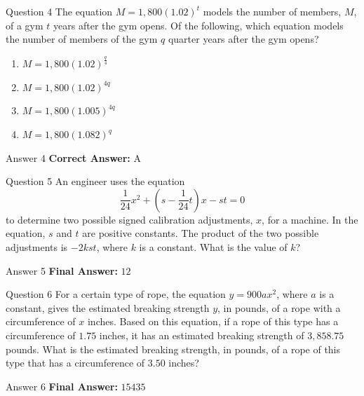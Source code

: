 \documentclass{beamer}
\begin{document}
\begin{frame}{Question 4}
\small
The equation \(M = 1{,}800(1.02)^t\) models the number of members, \(M\), of a gym \(t\) years after the gym opens.
Of the following, which equation models the number of members of the gym \(q\) quarter years after the gym opens?
\vspace{0.35cm}
\begin{enumerate}
    \item[A.] \(M = 1{,}800(1.02)^{\frac{q}{4}}\)
    \item[B.] \(M = 1{,}800(1.02)^{4q}\)
    \item[C.] \(M = 1{,}800(1.005)^{4q}\)
    \item[D.] \(M = 1{,}800(1.082)^q\)
\end{enumerate}
\end{frame}
\begin{frame}{Answer 4}
\small
\textbf{Correct Answer:} A
\end{frame}

\begin{frame}{Question 5}
\small
An engineer uses the equation
\[
\frac{1}{24}x^{2} + \left(s - \frac{1}{24}t\right)x - st = 0
\]
to determine two possible signed calibration adjustments, \(x\), for a machine. In the equation, \(s\) and \(t\) are positive constants.
The product of the two possible adjustments is \(-2kst\), where \(k\) is a constant.
What is the value of \(k\)?
\end{frame}
\begin{frame}{Answer 5}
\small
\textbf{Final Answer:} $\boxed{12}$
\end{frame}

\begin{frame}{Question 6}
\small
For a certain type of rope, the equation \(y = 900ax^{2}\), where \(a\) is a constant, gives the estimated breaking strength \(y\), in pounds, of a rope with a circumference of \(x\) inches.
Based on this equation, if a rope of this type has a circumference of \(1.75\) inches, it has an estimated breaking strength of \(3{,}858.75\) pounds.
What is the estimated breaking strength, in pounds, of a rope of this type that has a circumference of \(3.50\) inches?
\end{frame}
\begin{frame}{Answer 6}
\small
\textbf{Final Answer:} $\boxed{15435}$
\end{frame}
\end{document}
